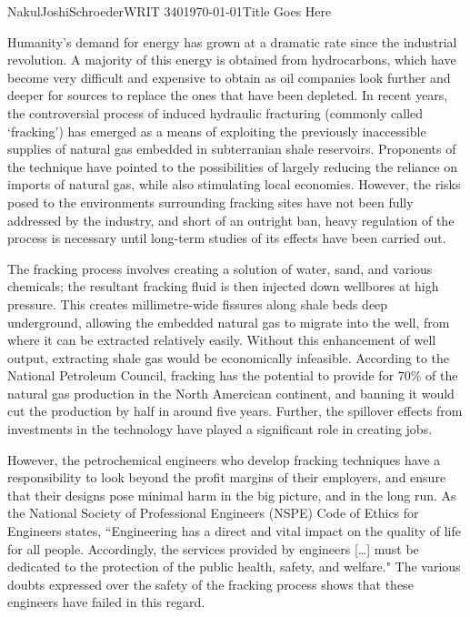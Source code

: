 \documentclass[12pt,letterpaper]{article}
\begin{document}
\begin{mla}{Nakul}{Joshi}{Schroeder}{WRIT 340}{\today}{Title Goes Here}

Humanity's demand for energy has grown at a dramatic rate since the industrial revolution. A majority of this energy is obtained from hydrocarbons, which have become very difficult and expensive to obtain as oil companies look further and deeper for sources to replace the ones that have been depleted. In recent years, the controversial process of induced hydraulic fracturing (commonly called `fracking') has emerged as a means of exploiting the previously inaccessible supplies of natural gas embedded in subterranian shale reservoirs. Proponents of the technique have pointed to the possibilities of largely reducing the reliance on imports of natural gas, while also stimulating local economies. However, the risks posed to the environments surrounding fracking sites have not been fully addressed by the industry, and short of an outright ban, heavy regulation of the process is necessary until long-term studies of its effects have been carried out.

The fracking process involves creating a solution of water, sand, and various chemicals; the resultant fracking fluid is then injected down wellbores at high pressure. This creates millimetre-wide fissures along shale beds deep underground, allowing the embedded natural gas to migrate into the well, from where it can be extracted relatively easily. Without this enhancement of well output, extracting shale gas would be economically infeasible. According to the National Petroleum Council, fracking has the potential to provide for 70\% of the natural gas production in the North Amercican continent, and banning it would cut the production by half in around five years. Further, the spillover effects from investments in the technology have played a significant role in creating jobs.

However, the petrochemical engineers who develop fracking techniques have a responsibility to look beyond the profit margins of their employers, and ensure that their designs pose minimal harm in the big picture, and in the long run. As the National Society of Professional Engineers (NSPE) Code of Ethics for Engineers states, ``Engineering has a direct and vital impact on the quality of life for all people. Accordingly, the services provided by engineers [\ldots] must be dedicated to the protection of the public health, safety, and welfare." The various doubts expressed over the safety of the fracking process shows that these engineers have failed in this regard.


\end{mla}
\end{document}
